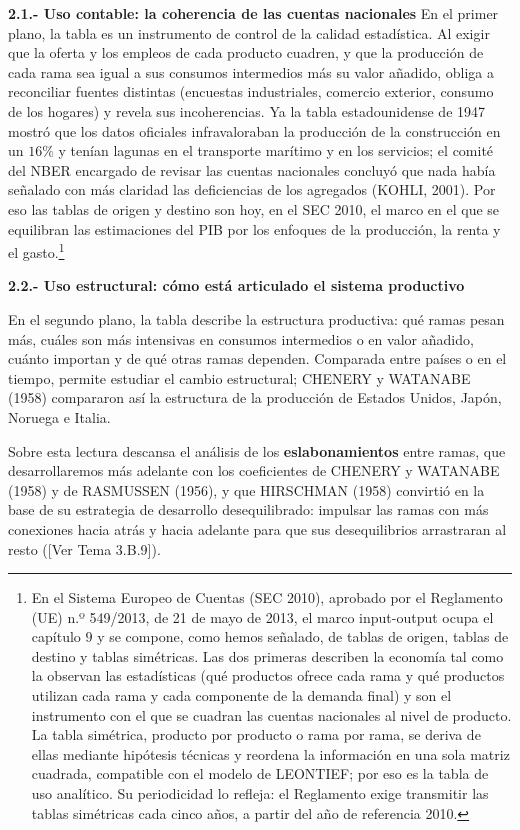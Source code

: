 \documentclass[10pt,a4paper]{article}
\newcommand{\authorfont}[1]{{\fontfamily{EBGaramond-TLF}\selectfont #1}}
\begin{document}
\textbf{2.1.- Uso contable: la coherencia de las cuentas nacionales}
En el primer plano, la tabla es un instrumento de control de la calidad estadística. Al exigir que la oferta y los empleos de cada producto cuadren, y que la producción de cada rama sea igual a sus consumos intermedios más su valor añadido, obliga a reconciliar fuentes distintas (encuestas industriales, comercio exterior, consumo de los hogares) y revela sus incoherencias. Ya la tabla estadounidense de 1947 mostró que los datos oficiales infravaloraban la producción de la construcción en un $16\%$ y tenían lagunas en el transporte marítimo y en los servicios; el comité del NBER encargado de revisar las cuentas nacionales concluyó que nada había señalado con más claridad las deficiencias de los agregados (KOHLI, 2001). Por eso las tablas de origen y destino son hoy, en el SEC 2010, el marco en el que se equilibran las estimaciones del PIB por los enfoques de la producción, la renta y el gasto.\footnote{%
  En el Sistema Europeo de Cuentas (SEC 2010), aprobado por el Reglamento (UE) n.º 549/2013, de 21 de mayo de 2013, el marco input-output ocupa el capítulo $9$ y se compone, como hemos señalado, de tablas de origen, tablas de destino y tablas simétricas. Las dos primeras describen la economía tal como la observan las estadísticas (qué productos ofrece cada rama y qué productos utilizan cada rama y cada componente de la demanda final) y son el instrumento con el que se cuadran las cuentas nacionales al nivel de producto. La tabla simétrica, producto por producto o rama por rama, se deriva de ellas mediante hipótesis técnicas y reordena la información en una sola matriz cuadrada, compatible con el modelo de LEONTIEF; por eso es la tabla de uso analítico. Su periodicidad lo refleja: el Reglamento exige transmitir las tablas simétricas cada cinco años, a partir del año de referencia 2010.
} 

\textbf{2.2.- Uso estructural: cómo está articulado el sistema productivo}

En el segundo plano, la tabla describe la estructura productiva: qué ramas pesan más, cuáles son más intensivas en consumos intermedios o en valor añadido, cuánto importan y de qué otras ramas dependen. Comparada entre países o en el tiempo, permite estudiar el cambio estructural; CHENERY y WATANABE (1958) compararon así la estructura de la producción de Estados Unidos, Japón, Noruega e Italia. 

Sobre esta lectura descansa el análisis de los \textbf{eslabonamientos} entre ramas, que desarrollaremos más adelante con los coeficientes de CHENERY y WATANABE (1958) y de RASMUSSEN (1956), y que HIRSCHMAN (1958) convirtió en la base de su estrategia de desarrollo desequilibrado: impulsar las ramas con más conexiones hacia atrás y hacia adelante para que sus desequilibrios arrastraran al resto ([\authorfont{Ver Tema 3.B.9}]).
\end{document}
